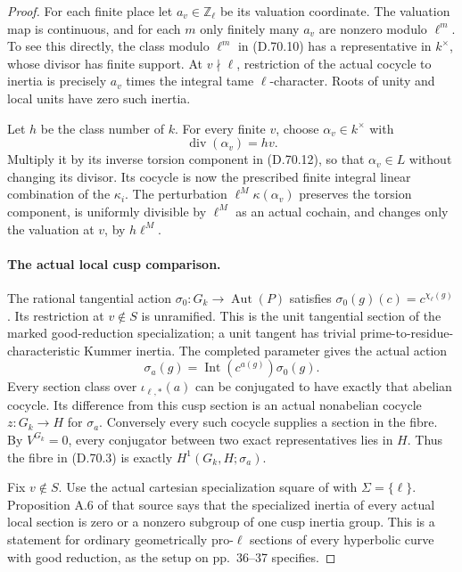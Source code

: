 \begin{proof}
For each finite place let \(a_v\in\mathbb Z_\ell\)
be its valuation coordinate. The valuation map is
continuous, and for each \(m\) only finitely many
\(a_v\) are nonzero modulo \(\ell^m\). To see this
directly, the class modulo \(\ell^m\) in (D.70.10)
has a representative in \(k^\times\), whose divisor
has finite support. At \(v\nmid\ell\), restriction
of the actual cocycle to inertia is precisely
\(a_v\) times the integral tame \(\ell\)-character.
Roots of unity and local units have zero such inertia.

Let \(h\) be the class number of \(k\). For every
finite \(v\), choose \(\alpha_v\in k^\times\) with
\[
                       \operatorname{div}(\alpha_v)=h v.
                                                        \tag{D.70.14}
\]
Multiply it by its inverse torsion component in
(D.70.12), so that \(\alpha_v\in L\) without changing
its divisor. Its cocycle is now the prescribed finite
integral linear combination of the \(\kappa_i\).
The perturbation \(\ell^M\kappa(\alpha_v)\) preserves
the torsion component, is uniformly divisible by
\(\ell^M\) as an actual cochain, and changes only
the valuation at \(v\), by \(h\ell^M\).

\paragraph{The actual local cusp comparison.}
The rational tangential action
\(\sigma_0:G_k\to\operatorname{Aut}(P)\) satisfies
\(\sigma_0(g)(c)=c^{\chi_\ell(g)}\). Its restriction
at \(v\notin S\) is unramified. This is the unit
tangential section of the marked good-reduction
specialization; a unit tangent has trivial
prime-to-residue-characteristic Kummer inertia.
The completed parameter gives the actual action
\[
 \sigma_a(g)=\operatorname{Int}(c^{a(g)})\sigma_0(g).
                                                        \tag{D.70.15}
\]
Every section class over \(\iota_{\ell,*}(a)\) can
be conjugated to have exactly that abelian cocycle.
Its difference from this cusp section is an actual
nonabelian cocycle \(z:G_k\to H\) for \(\sigma_a\).
Conversely every such cocycle supplies a section
in the fibre. By \(V^{G_k}=0\), every conjugator
between two exact representatives lies in \(H\).
Thus the fibre in (D.70.3) is exactly
\(H^1(G_k,H;\sigma_a)\).

Fix \(v\notin S\). Use the actual cartesian
specialization square of
\cite[Definition A.3 and Remark A.3.1, p.~38]{DE_Hoshi2012}
with \(\Sigma=\{\ell\}\). Proposition A.6 of that
source says that the specialized inertia of every
actual local section is zero or a nonzero subgroup
of one cusp inertia group. This is a statement for
ordinary geometrically pro-\(\ell\) sections of
every hyperbolic curve with good reduction, as the
setup on pp.~36--37 specifies.


\end{proof}
